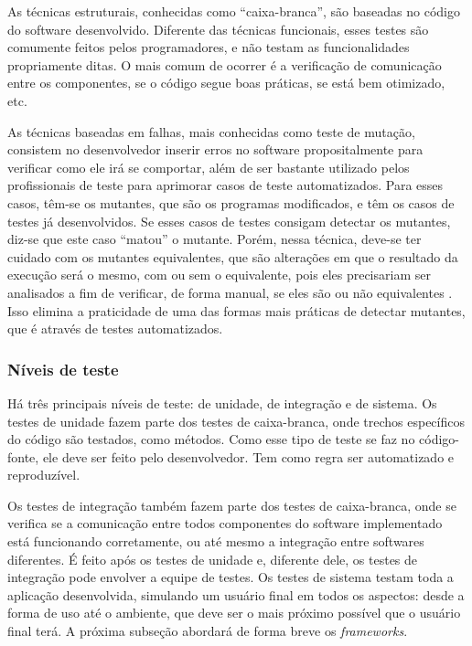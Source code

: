\documentclass[twoside,english,brazilian]{UNISINOSartigo}
\begin{document}
As técnicas estruturais, conhecidas como ``caixa-branca'', são baseadas no código do software desenvolvido. Diferente das técnicas funcionais, esses testes são comumente feitos pelos programadores, e não testam as funcionalidades propriamente ditas. O mais comum de ocorrer é a verificação de comunicação entre os componentes, se o código segue boas práticas, se está bem otimizado, etc.  

As técnicas baseadas em falhas, mais conhecidas como teste de mutação, consistem no desenvolvedor inserir erros no software propositalmente para verificar como ele irá se comportar, além de ser bastante utilizado pelos profissionais de teste para aprimorar casos de teste automatizados. Para esses casos, têm-se os mutantes, que são os programas modificados, e têm os casos de testes já desenvolvidos. Se esses casos de testes consigam detectar os mutantes, diz-se que este caso ``matou'' o mutante. Porém, nessa técnica, deve-se ter cuidado com os mutantes equivalentes, que são alterações em que o resultado da execução será o mesmo, com ou sem o equivalente, pois eles precisariam ser analisados a fim de verificar, de forma manual, se eles são ou não equivalentes \cite{guilhon_2015}. Isso elimina a praticidade de uma das formas mais práticas de detectar mutantes, que é através de testes automatizados. 


\subsubsection{Níveis de teste}
Há três principais níveis de teste: de unidade, de integração e de sistema. Os testes de unidade fazem parte dos testes de caixa-branca, onde trechos específicos do código são testados, como métodos. Como esse tipo de teste se faz no código-fonte, ele deve ser feito pelo desenvolvedor. Tem como regra ser automatizado e reproduzível.

Os testes de integração também fazem parte dos testes de caixa-branca, onde se verifica se a comunicação entre todos componentes do software implementado está funcionando corretamente, ou até mesmo a integração entre softwares diferentes. É feito após os testes de unidade e, diferente dele, os testes de integração pode envolver a equipe de testes. Os testes de sistema testam toda a aplicação desenvolvida, simulando um usuário final em todos os aspectos: desde a forma de uso até o ambiente, que deve ser o mais próximo possível que o usuário final terá. A próxima subseção abordará de forma breve os \textit{frameworks}.
\end{document}
